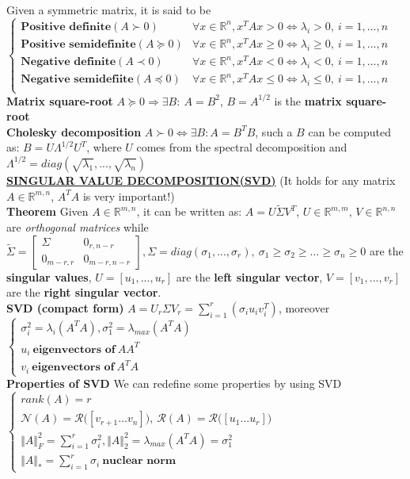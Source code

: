 \documentclass[a4paper]{article}
\begin{document}
Given a symmetric matrix, it is said to be $\begin{cases}
    \textbf{Positive definite} (A\succ0)& \forall x\in \mathbb{R}^n, x^T{A}x>0 \iff \lambda_i>0,\ i=1,...,n\\
    \textbf{Positive semidefinite} (A\succeq 0)&\forall x\in \mathbb{R}^n, x^T{A}x\ge0 \iff \lambda_i\ge0,\ i=1,...,n\\
    \textbf{Negative definite}(A\prec 0)&\forall x\in \mathbb{R}^n, x^T{A}x<0 \iff \lambda_i<0,\ i=1,...,n\\
    \textbf{Negative semidefiite} (A\preceq 0)&\forall x\in \mathbb{R}^n, x^T{A}x\le0 \iff \lambda_i\le0,\ i=1,...,n\\
\end{cases}$\\
\textbf{Matrix square-root} $A\succeq0 \Rightarrow \exists{B}: \ A = B^2$, $B=A^{1/2}$ is the \textbf{matrix square-root}\\
\textbf{Cholesky decomposition} $A\succ0 \iff \exists B: A=B^T{B}$, such a $B$ can be computed as: $B=U\Lambda^{1/2}U^T$, where $U$ comes from the spectral decomposition and $\Lambda^{1/2}=diag(\sqrt{\lambda_1}, ..., \sqrt{\lambda_n})$\\
\textbf{\underline{SINGULAR VALUE DECOMPOSITION(SVD)}} (It holds for any matrix $A\in\mathbb{R}^{m,n}$, $A^T{A}$ is very important!)\\
\textbf{Theorem} Given $A\in\mathbb{R}^{m,n}$, it can be written as: $A=U\tilde{\Sigma}V^T$, $U\in\mathbb{R}^{m,m}$, $V\in\mathbb{R}^{n,n}$ are \textit{orthogonal matrices} while $\tilde{\Sigma}=\begin{bmatrix}
    \Sigma&0_{r,n-r}\\
    0_{m-r,r}&0_{m-r,n-r}
\end{bmatrix}, \Sigma = diag(\sigma_1, ..., \sigma_r), \ \sigma_1 \ge \sigma_2 \ge ... \ge \sigma_n \ge0$ are the \textbf{singular values}, $U=[u_1,...,u_r]$ are the \textbf{left singular vector}, $V=[v_1, ..., v_r]$ are the \textbf{right singular vector}.\\
\textbf{SVD (compact form)} $A=U_r\Sigma V_r=\sum_{i=1}^r{(\sigma_i u_i v_i^T)}$, moreover $\begin{cases}
    \sigma_i^2 = \lambda_i({A^T}{A}), \sigma_1^2 = \lambda_{max}({A^T A})\\
    u_i \ \textbf{eigenvectors of} \ AA^T\\
    v_i \ \textbf{eigenvectors of} \ A^T{A}
\end{cases}$\\
\textbf{Properties of SVD} We can redefine some properties by using SVD $\begin{cases}
    rank(A)=r\\
    \mathcal{N}(A)=\mathcal{R}\bigl([v_{r+1}\dots v_n]\bigr), \ \mathcal{R}(A)=\mathcal{R}\bigl([u_1\dots u_r]\bigr)\\
    \Vert A \Vert_F^2 = \sum_{i=1}^r {\sigma_i^2},
    \Vert A \Vert_2^2 = \lambda_{max}(A^T A) = \sigma_1^2\\
    \Vert A \Vert_* = \sum_{i=1}^r \sigma_i \ \textbf{nuclear norm}
\end{cases}$\\
\end{document}
